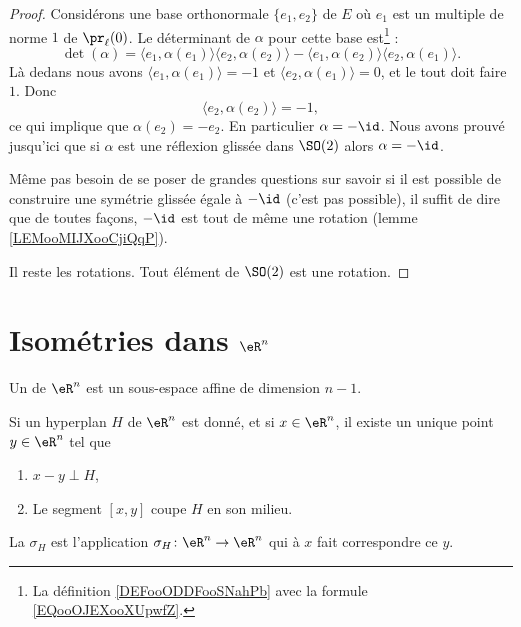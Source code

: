 \begin{proof}
    Considérons une base orthonormale \( \{ e_1,e_2 \}\) de \( E\) où \(e_1 \) est un multiple de norme \( 1\) de \( \pr_{\ell}(0)\). Le déterminant de \( \alpha\) pour cette base est\footnote{La définition \ref{DEFooODDFooSNahPb} avec la formule \eqref{EQooOJEXooXUpwfZ}.} :
    \begin{equation}
        \det(\alpha)=\langle e_1, \alpha(e_1)\rangle \langle e_2, \alpha(e_2)\rangle -\langle e_1, \alpha(e_2)\rangle \langle e_2, \alpha(e_1)\rangle.
    \end{equation}
    Là dedans nous avons \( \langle e_1, \alpha(e_1)\rangle =-1\) et \( \langle e_2, \alpha(e_1)\rangle =0\), et le tout doit faire \( 1\). Donc
    \begin{equation}
        \langle e_2, \alpha(e_2)\rangle =-1,
    \end{equation}
    ce qui implique que \( \alpha(e_2)=-e_2\). En particulier \( \alpha=-\id\). Nous avons prouvé jusqu'ici que si \( \alpha\) est une réflexion glissée dans \( \SO(2)\) alors \( \alpha=-\id\). 

    Même pas besoin de se poser de grandes questions sur savoir si il est possible de construire une symétrie glissée égale à \( -\id\) (c'est pas possible), il suffit de dire que de toutes façons, \( -\id\) est tout de même une rotation (lemme \ref{LEMooMIJXooCjiQqP}).
    
    Il reste les rotations. Tout élément de \( \SO(2)\) est une rotation.
\end{proof}

\section{Isométries dans \( \eR^n\)}

\begin{definition}
    Un  de \( \eR^n\) est un sous-espace affine de dimension \( n-1\). 
\end{definition}
    
\begin{lemmaDef}
    Si un hyperplan \( H\) de \( \eR^n\) est donné, et si \( x\in \eR^n\), il existe un unique point \( y\in \eR^n\) tel que
    \begin{enumerate}
        \item
            \( x-y\perp H\),
        \item
            Le segment \( [x,y]\) coupe \( H\) en son milieu.
    \end{enumerate}
    La  \( \sigma_H\) est l'application $\sigma_H\colon \eR^n\to \eR^n $ qui à \( x\) fait correspondre ce \( y\).
\end{lemmaDef}

